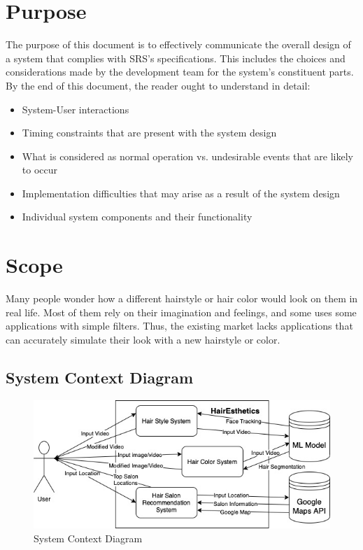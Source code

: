 \documentclass[12pt, titlepage]{article}
\begin{document}
\section{Purpose}
The purpose of this document is to effectively communicate the overall design of a system that complies with SRS's specifications. This includes the choices and considerations made by the development team for the system's constituent parts. By the end of this document, the reader ought to understand in detail:
\begin{itemize}
    \item System-User interactions
    \item Timing constraints that are present with the system design
    \item What is considered as normal operation vs. undesirable events that are likely to occur
    \item Implementation difficulties that may arise as a result of the system design
    \item Individual system components and their functionality
\end{itemize}

\section{Scope}
\noident Many people wonder how a different hairstyle or hair color would look on them in real life. Most of them rely on their imagination and feelings, and some uses some applications with simple filters. Thus, the existing market lacks applications that can accurately simulate their look with a new hairstyle or color.

\subsection{System Context Diagram}
\begin{center}
\begin{figure}[H]
\graphicspath{ {system_context_diagram_1.jpg} }
\includegraphics[width=1\textwidth]{system_context_diagram_1}
\caption{System Context Diagram}
\label{Fig_SystemContext} 
\end{figure}
\end{center}
\end{document}
